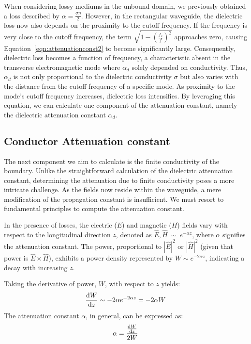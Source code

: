 When considering lossy mediums in the unbound domain, we previously obtained a loss described by $\alpha = \frac{\sigma\eta}{2}$. However, in the rectangular waveguide, the dielectric loss now also depends on the proximity to the cutoff frequency. If the frequency is very close to the cutoff frequency, the term $\sqrt{1 - \left(\frac{f_c}{f}\right)^{2}}$ approaches zero, causing Equation~\eqref{eqn:attenuationconst2} to become significantly large. Consequently, dielectric loss becomes a function of frequency, a characteristic absent in the transverse electromagnetic mode where $\alpha_{d}$ solely depended on conductivity. Thus, $\alpha_{d}$ is not only proportional to the dielectric conductivity $\sigma$ but also varies with the distance from the cutoff frequency of a specific mode. As proximity to the mode's cutoff frequency increases, dielectric loss intensifies. By leveraging this equation, we can calculate one component of the attenuation constant, namely the dielectric attenuation constant $\alpha_{d}$.

\subsection{Conductor Attenuation constant}
The next component we aim to calculate is the finite conductivity of the boundary. Unlike the straightforward calculation of the dielectric attenuation constant, determining the attenuation due to finite conductivity poses a more intricate challenge. As the fields now reside within the waveguide, a mere modification of the propagation constant is insufficient. We must resort to fundamental principles to compute the attenuation constant.

In the presence of losses, the electric ($E$) and magnetic ($H$) fields vary with respect to the longitudinal direction $z$, denoted as ${\hat{E}}, {\hat{H}} \ \sim\ e^{-\alpha z}$, where $\alpha$ signifies the attenuation constant. The power, proportional to $|{\hat{E}}|^{2}$ or $|{\hat{H}}|^{2}$ (given that power is ${\hat{E}}\times{\hat{H}}$), exhibits a power density represented by $W\sim e^{-2\alpha z}$, indicating a decay with increasing $z$. 

Taking the derivative of power, $W$, with respect to $z$ yields:
\begin{dmath*}
\dv{W}{z}\sim-2\alpha e^{-2\alpha z} = -2\alpha W 
\end{dmath*}
The attenuation constant $\alpha$, in general, can be expressed as:
\begin{equation*}
\alpha = \frac{\dv{W}{z}}{2W}
\label{eqn:calcalpha}
\end{equation*}

